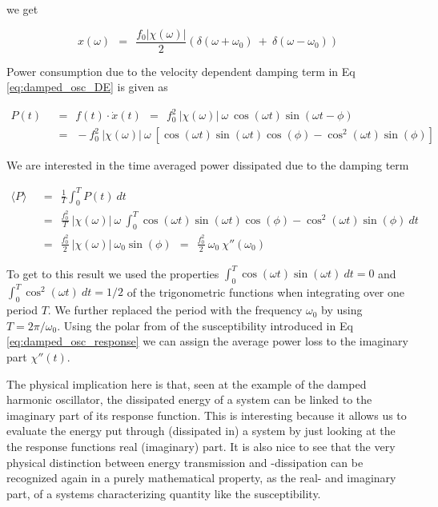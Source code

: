 \documentclass[10pt]{report}
\numberwithin{equation}{chapter}
\newcommand{\refEq}[1]{
  Eq  \ref{#1}
}
\begin{document}
we get

\begin{equation}
  x(\omega) ~~=~~  \frac{f_0 |\chi(\omega)|}{2} (\delta(\omega + \omega_0) ~+~ \delta(\omega - \omega_0))
\end{equation}


%


Power consumption due to the velocity dependent damping term in \refEq{eq:damped_osc_DE} is given as

\begin{align}
  P(t) ~~& =~~ f(t) \cdot \dot{x}(t) ~~=~~ f_0^2\ |\chi(\omega)|\ \omega\ \cos(\omega t) \sin(\omega t - \phi)\nonumber \\
  ~~& =~~ - f_0^2\ |\chi(\omega)|\ \omega\ \left[ \cos(\omega t) \sin(\omega t) \cos(\phi) - \cos^2(\omega t) \sin(\phi) \right]
\end{align}


We are interested in the time averaged power dissipated due to the damping term

\begin{align}
  \langle P \rangle ~~& =~~ \frac{1}{T} \int_0^T P(t)\ dt \nonumber \\ 
  ~~& =~~ \frac{f_0^2}{T}\ |\chi(\omega)|\ \omega\ \int_0^T \cos(\omega t) \sin(\omega t) \cos(\phi) - 
  \cos^2(\omega t) \sin(\phi)\ dt \nonumber \\
  ~~& =~~ \frac{f_0^2}{2}\ |\chi(\omega)|\ \omega_0 \sin(\phi) 
  ~~=~~ \frac{f_0^2}{2}\ \omega_0\ \chi''(\omega_0)
\end{align}

To get to this result we used  the properties $\int_0^T \cos(\omega t) \sin(\omega t)\ dt = 0$ and $\int_0^T \cos^2(\omega t)\ dt = 1/2$ of the trigonometric functions when integrating over one period $T$. We further replaced the period with the frequency $\omega_0$ by using $T=2\pi /\omega_0$.
Using the polar from of the susceptibility introduced in \refEq{eq:damped_osc_response} we can assign the average power loss to the imaginary part $\chi''(t)$.

The physical implication here is that, seen at the example of the damped harmonic oscillator, the dissipated energy of a system can be linked to the imaginary part of its response function.
This is interesting because it allows us to evaluate the energy put through (dissipated in) a system by just looking at the the response functions real (imaginary) part. 
It is also nice to see that the very physical distinction between energy transmission and -dissipation can be recognized again in a purely mathematical property, as the real- and imaginary part, of a systems characterizing quantity like the susceptibility.
\end{document}
